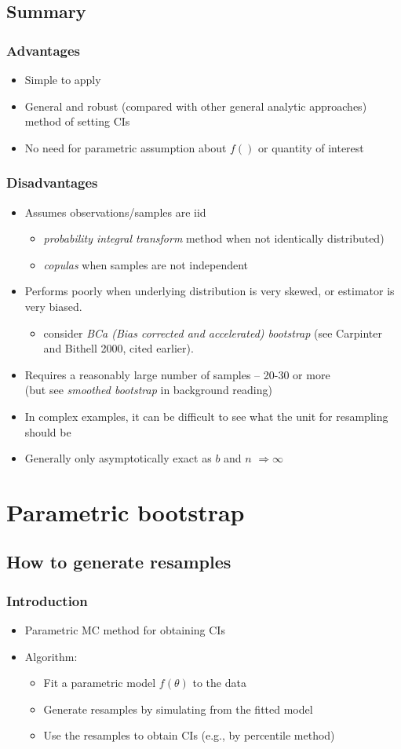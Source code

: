 \documentclass[a4paper,12pt]{article}
\newcommand{\bi}{\begin{itemize}}
\newcommand{\ei}{\end{itemize}}
\begin{document}
\subsection{Summary}

\begin{frame}
    \frametitle{Advantages}
    \bi
        \item Simple to apply
        \item General and robust (compared with other general analytic approaches) method of setting CIs
        \item No need for parametric assumption about $f()$ or quantity of interest
    \ei
\end{frame}

\begin{frame}[fragile]
    \frametitle{Disadvantages}
    \bi
      \item Assumes observations/samples are iid
	    \bi
				\item \textit{probability integral transform} method when not identically distributed)
				\item \textit{copulas} when samples are not independent
			\ei
			\item <2-> Performs poorly when underlying distribution is very skewed, or estimator is very biased.
			\bi
			  \item consider \textit{BCa (Bias corrected and accelerated) bootstrap} (see Carpinter and Bithell 2000, cited earlier).
			\ei
      \item <3-> Requires a reasonably large number of samples -- 20-30 or more\\
        (but see \textit{smoothed bootstrap}  in background reading)
      \item <4-> In complex examples, it can be difficult to see what the unit for resampling should be
      \item <5-> Generally only asymptotically exact as $b$ and $n$ $\Rightarrow \infty$
    \ei
\end{frame}

\section{Parametric bootstrap}

\subsection{How to generate resamples}

\begin{frame}
    \frametitle{Introduction}
    \bi
        \item Parametric MC method for obtaining CIs
        \item Algorithm:
            \bi
                \item Fit a parametric model $f(\theta)$ to the data
                \item Generate resamples by simulating from the fitted model
                \item Use the resamples to obtain CIs (e.g., by percentile method)
            \ei
    \ei
\end{frame}
\end{document}
